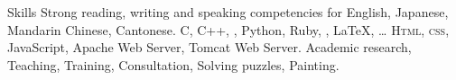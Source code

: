 
\begin{rubric}{Skills}
\entry*[Languages]
	Strong reading, writing and speaking competencies for English, Japanese, Mandarin Chinese, Cantonese.
	C, C++, , Python, Ruby, , \LaTeX, \ldots
{}
	\textsc{Html, css}, JavaScript, Apache Web Server, Tomcat Web Server.
\entry*[Misc.]
	Academic research, Teaching, Training, Consultation, Solving puzzles, Painting.
\end{rubric}
